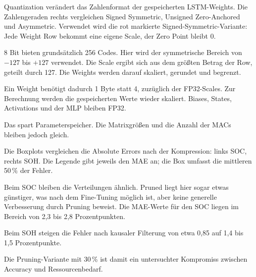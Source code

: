 \begin{sprechtext}

Quantization verändert das Zahlenformat der gespeicherten LSTM-Weights. Die Zahlengeraden rechts vergleichen Signed Symmetric, Unsigned Zero-Anchored und Asymmetric. Verwendet wird die rot markierte Signed-Symmetric-Variante: Jede Weight Row bekommt eine eigene Scale, der Zero Point bleibt 0.

8 Bit bieten grundsätzlich 256 Codes. Hier wird der symmetrische Bereich von $-127$ bis $+127$ verwendet. Die Scale ergibt sich aus dem größten Betrag der Row, geteilt durch 127. Die Weights werden darauf skaliert, gerundet und begrenzt.

Ein Weight benötigt dadurch 1 Byte statt 4, zuzüglich der FP32-Scales. Zur Berechnung werden die gespeicherten Werte wieder skaliert. Biases, States, Activations und der MLP bleiben FP32.

Das spart Parameterspeicher. Die Matrixgrößen und die Anzahl der MACs bleiben jedoch gleich.

\end{sprechtext}


\begin{sprechtext}

Die Boxplots vergleichen die Absolute Errors nach der Kompression: links SOC, rechts SOH. Die Legende gibt jeweils den MAE an; die Box umfasst die mittleren 50\,\% der Fehler.

Beim SOC bleiben die Verteilungen ähnlich. Pruned liegt hier sogar etwas günstiger, was nach dem Fine-Tuning möglich ist, aber keine generelle Verbesserung durch Pruning beweist. Die MAE-Werte für den SOC liegen im Bereich von 2{,}3 bis 2{,}8 Prozentpunkten.

Beim SOH steigen die Fehler nach kausaler Filterung von etwa 0{,}85 auf 1{,}4 bis 1{,}5 Prozentpunkte.

Die Pruning-Variante mit 30\,\% ist damit ein untersuchter Kompromiss zwischen Accuracy und Ressourcenbedarf.

\end{sprechtext}


